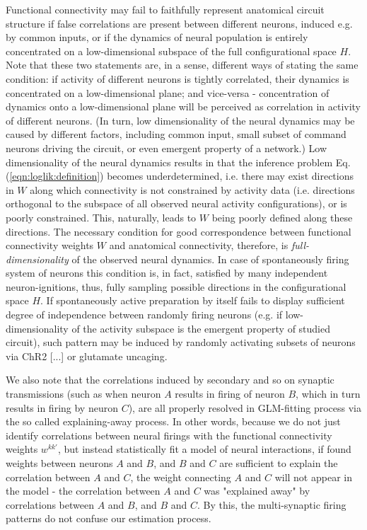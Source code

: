 \documentclass[amsmath,amssymb]{revtex4}
\begin{document}
Functional connectivity may fail to faithfully represent anatomical circuit structure if false correlations are present between different neurons, induced e.g. by common inputs, or if the dynamics of neural population is entirely concentrated on a low-dimensional subspace of the full configurational space $H$. Note that these two statements are, in a sense, different ways of stating the same condition: if activity of different neurons is tightly correlated, their dynamics is concentrated on a low-dimensional plane; and vice-versa - concentration of dynamics onto a low-dimensional plane will be perceived as correlation in activity of different neurons. (In turn, low dimensionality of the neural dynamics may be caused by different factors, including common input, small subset of command neurons driving the circuit, or even emergent property of a network.) Low dimensionality of the neural dynamics results in that the inference problem Eq.(\ref{eqn:loglik:definition}) becomes underdetermined, i.e. there may exist directions in $W$ along which connectivity is not constrained by activity data (i.e. directions orthogonal to the subspace of all observed neural activity configurations), or is poorly constrained. This, naturally, leads to $W$ being poorly defined along these directions. The necessary condition for good correspondence between functional connectivity weights $W$ and anatomical connectivity, therefore, is {\em full-dimensionality} of the observed neural dynamics. In case of spontaneously firing system of neurons this condition is, in fact, satisfied by many independent neuron-ignitions, thus, fully sampling possible directions in the configurational space $H$. If spontaneously active preparation by itself fails to display sufficient degree of independence between randomly firing neurons (e.g. if low-dimensionality of the activity subspace is the emergent property of studied circuit), such pattern may be induced by randomly activating subsets of neurons via ChR2 [...] or glutamate uncaging.

We also note that the correlations induced by secondary and so on synaptic transmissions (such as when neuron $A$ results in firing of neuron $B$, which in turn results in firing by neuron $C$), are all properly resolved in GLM-fitting process via the so called explaining-away process. In other words, because we do not just identify correlations between neural firings with the functional connectivity weights $w^{kk'}$, but instead statistically fit a model of neural interactions, if found weights between neurons $A$ and $B$, and $B$ and $C$ are sufficient to explain the correlation between $A$ and $C$, the weight connecting $A$ and $C$ will not appear in the model - the correlation between $A$ and $C$ was "explained away" by correlations between $A$ and $B$, and $B$ and $C$. By this, the multi-synaptic firing patterns do not confuse our estimation process.
\end{document}
